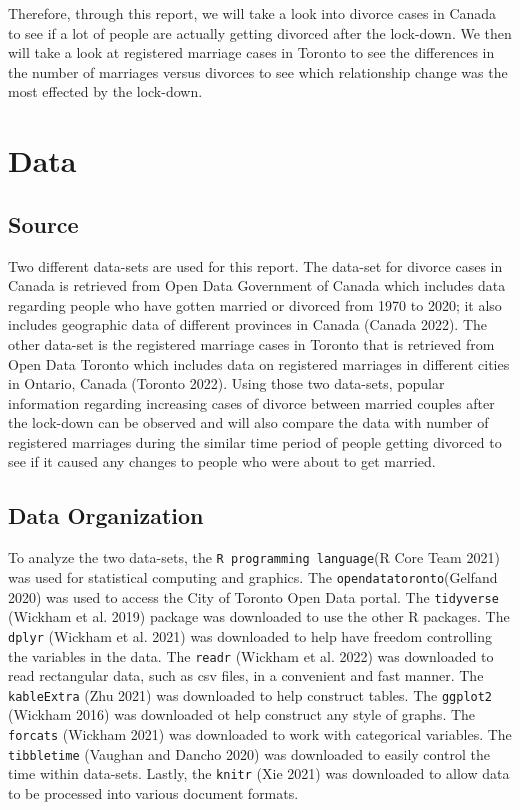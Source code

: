\documentclass[
]{article}
\begin{document}
Therefore, through this report, we will take a look into divorce cases in Canada to see if a lot of people are actually getting divorced after the lock-down. We then will take a look at registered marriage cases in Toronto to see the differences in the number of marriages versus divorces to see which relationship change was the most effected by the lock-down.

\hypertarget{data}{%
\section{Data}\label{data}}

\hypertarget{source}{%
\subsection{Source}\label{source}}

Two different data-sets are used for this report. The data-set for divorce cases in Canada is retrieved from Open Data Government of Canada which includes data regarding people who have gotten married or divorced from 1970 to 2020; it also includes geographic data of different provinces in Canada (Canada 2022). The other data-set is the registered marriage cases in Toronto that is retrieved from Open Data Toronto which includes data on registered marriages in different cities in Ontario, Canada (Toronto 2022). Using those two data-sets, popular information regarding increasing cases of divorce between married couples after the lock-down can be observed and will also compare the data with number of registered marriages during the similar time period of people getting divorced to see if it caused any changes to people who were about to get married.

\hypertarget{data-organization}{%
\subsection{Data Organization}\label{data-organization}}

To analyze the two data-sets, the \texttt{R\ programming\ language}(R Core Team 2021) was used for statistical computing and graphics.
The \texttt{opendatatoronto}(Gelfand 2020) was used to access the City of Toronto Open Data portal. The \texttt{tidyverse} (Wickham et al. 2019) package was downloaded to use the other R packages. The \texttt{dplyr} (Wickham et al. 2021) was downloaded to help have freedom controlling the variables in the data. The \texttt{readr} (Wickham et al. 2022) was downloaded to read rectangular data, such as csv files, in a convenient and fast manner. The \texttt{kableExtra} (Zhu 2021) was downloaded to help construct tables. The \texttt{ggplot2} (Wickham 2016) was downloaded ot help construct any style of graphs. The \texttt{forcats} (Wickham 2021) was downloaded to work with categorical variables. The \texttt{tibbletime} (Vaughan and Dancho 2020) was downloaded to easily control the time within data-sets. Lastly, the \texttt{knitr} (Xie 2021) was downloaded to allow data to be processed into various document formats.
\end{document}
